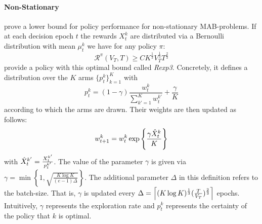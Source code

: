 \paragraph{Non-Stationary} \cite{auer2002finite} prove a lower bound for policy performance for non-stationary MAB-problems. If at each decision epoch $t$ the rewards $X_t^k$ are distributed via a Bernoulli distribution with mean $\mu_t^k$ we have for any policy $\pi$:
\begin{equation*}
    \mathcal{R}^\pi(V_T,T) \geq CK^{\frac{1}{3}}V_T^{\frac{1}{3}}T^{\frac{2}{3}}
\end{equation*}
\cite{besbes2019optimal} provide a policy with this optimal bound called \textit{Rexp3}. Concretely, it defines a distribution over the $K$ arms $\{p_t^k\}_{k=1}^K$ with
\begin{equation*}
    p_t^k = (1-\gamma)\frac{w_t^k}{\sum_{k'=1}^K w^{k'}_t} +\frac{\gamma}{K}
\end{equation*} according to which the arms are drawn. Their weights are then updated as follows:
\begin{equation*}
    w_{t+1}^k = w_t^k \exp{\left\{\frac{\gamma \Hat{X}_t^k}{K}\right\}}
\end{equation*}
with $\Hat{X}_t^{k'} = \frac{X_t^{k'}}{p_t^{k'}}$. The value of the parameter $\gamma$ is given via $\gamma = \min \left\{1, \sqrt{\frac{K \log K}{(e-1)\Delta}} \right\}$. The additional parameter $\Delta$ in this definition refers to the batch-size. That is, $\gamma$ is updated every $\Delta = \ceil*{(K \log K)^\frac{1}{3} (\frac{T}{V_T})^\frac{2}{3}}$ epochs. Intuitively, $\gamma$ represents the exploration rate and $p_t^k$ represents the certainty of the policy that $k$ is optimal. 
